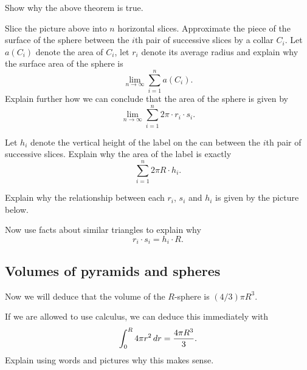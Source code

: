 \documentclass[hints,handout,noauthor,nooutcomes,12pt]{ximera}
\begin{document}
\begin{problem}
Show why the above theorem is true.

\begin{hint}
Slice the picture above into $n$ horizontal slices. Approximate the
piece of the surface of the sphere between the $i$th pair of
successive slices by a collar $C_{i}$. Let $a\left( C_{i}\right) $
denote the area of $C_{i}$, let $r_{i}$ denote its average radius and
explain why the surface area of the sphere is
\[
\lim_{n\to \infty}\sum_{i=1}^{n} a(C_i).
\]
Explain further how we can conclude that the area of the sphere is
given by
\[%
\lim_{n\to \infty}\sum_{i=1}^{n} 2\pi\cdot r_{i}\cdot s_{i}.
\]

\end{hint}
\begin{hint}
Let $h_{i}$ denote the vertical height of the label on the can between
the $i$th pair of successive slices. Explain why the area of the label is exactly%
\[%
\sum_{i=1}^{n} 2\pi R \cdot h_{i}.
\]
\end{hint}
\begin{hint}
Explain why the relationship between each $r_{i}$, $s_{i}$ and $h_{i}$
is given by the picture below.
\begin{image}
\end{image}
Now use facts about similar triangles to explain why
\[
r_{i}\cdot s_{i}=h_{i}\cdot R.
\]
\end{hint}
\end{problem}




\subsection{Volumes of pyramids and spheres}

Now we will deduce that the volume of the $R$-sphere is $(4/3) \pi
R^3$.

\begin{problem}
  If we are allowed to use calculus, we can deduce this immediately with
  \[
  \int_0^R 4\pi r^2 \,d r = \frac{4\pi R^3}{3}.
  \]
  Explain using words and pictures why this makes sense.
\end{problem}
\end{document}
